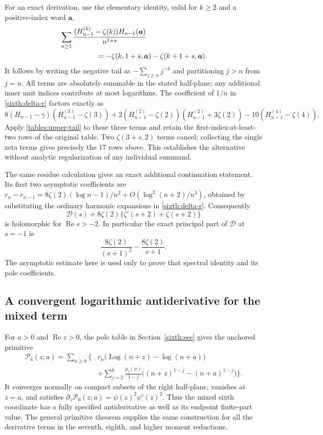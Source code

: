 \documentclass[11pt,a4paper]{article}
\numberwithin{equation}{section}
\theoremstyle{definition}
\theoremstyle{remark}
\DeclareMathOperator{\Log}{Log}
\newcommand{\re}{\operatorname{Re}}
\begin{document}
For an exact derivation, use the elementary identity, valid for
$k\ge2$ and a positive-index word $\boldsymbol a$,
\begin{equation}\label{tables:upper-tail}
 \begin{split}
 &\sum_{n\ge1}\frac{(H_{n-1}^{(k)}-\zeta(k))
                             H_{n-1}(\boldsymbol a)}{n^{1+s}}\\
 &\hspace{18mm}=-\zeta(k,1+s,\boldsymbol a)
                -\zeta(k+1+s,\boldsymbol a).
 \end{split}
\end{equation}
It follows by writing the negative tail as
$-\sum_{j\ge n}j^{-k}$ and partitioning $j>n$ from $j=n$.
All terms are absolutely summable in the stated half-plane; any
additional inner unit indices contribute at most logarithms.
The coefficient of $1/n$ in \eqref{sixth:delta-r} factors exactly as
\[
 8(H_{n-1}-\gamma)(H_{n-1}^{(3)}-\zeta(3))
 +2(H_{n-1}^{(2)}-\zeta(2))(H_{n-1}^{(2)}+3\zeta(2))
 -10(H_{n-1}^{(4)}-\zeta(4)).
\]
Apply \eqref{tables:upper-tail} to these three terms and retain
the first-index-at-least-two rows of the original table.
Two $\zeta(3+s,2)$ terms cancel; collecting the single zeta terms
gives precisely the 17 rows above.  This establishes the alternative
without analytic regularization of any individual summand.

The same residue calculation gives an exact additional continuation
statement.  Its first two asymptotic coefficients are
$r_n-r_{n-1}=8\zeta(2)(\log n-1)/n^2+
O(\log^2(n+2)/n^3)$, obtained by substituting the ordinary harmonic
expansions in \eqref{sixth:delta-r}.  Consequently
\[
 \mathcal D(s)+8\zeta(2)\{\zeta'(s+2)+\zeta(s+2)\}
\]
is holomorphic for $\re s>-2$.  In particular the exact principal
part of $\mathcal D$ at $s=-1$ is
\[
 \frac{8\zeta(2)}{(s+1)^2}-\frac{8\zeta(2)}{s+1}.
\]
The asymptotic estimate here is used only to prove that spectral
identity and its pole coefficients.

\subsection{A convergent logarithmic antiderivative for the mixed term}

For $a>0$ and $\re z>0$, the pole table in Section~\ref{sixth:sec}
gives the anchored primitive
\begin{equation}\label{tables:primitive6}
 \begin{split}
 \mathcal P_6(z;a)=\sum_{n\ge0}\biggl\{
 &r_n\bigl(\Log(n+z)-\log(n+a)\bigr)\\
 &+\sum_{j=2}^6\frac{p_j(n)}{1-j}
       \bigl((n+z)^{1-j}-(n+a)^{1-j}\bigr)\biggr\}.
 \end{split}
\end{equation}
It converges normally on compact subsets of the right half-plane,
vanishes at $z=a$, and satisfies
$\partial_z\mathcal P_6(z;a)=\psi(z)^2\psi'(z)^2$.
Thus the mixed sixth coordinate has a fully specified antiderivative
as well as its endpoint finite-part value.  The general primitive
theorem supplies the same construction for all the derivative terms
in the seventh, eighth, and higher moment reductions.
\end{document}
